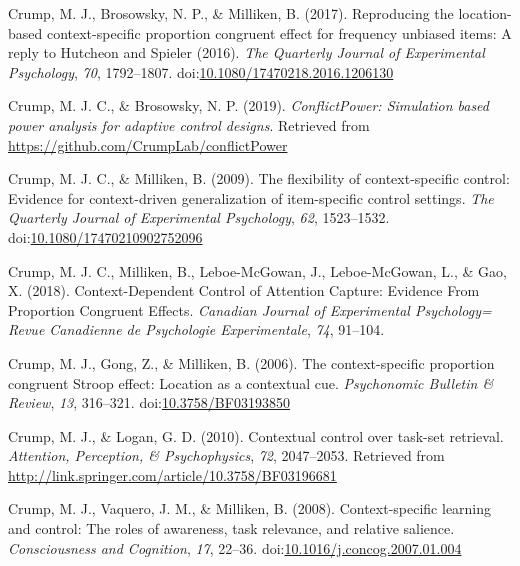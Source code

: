 \documentclass[english,,man,floatsintext]{apa6}
\begin{document}
\leavevmode\hypertarget{ref-crump_reproducing_2017}{}%
Crump, M. J., Brosowsky, N. P., \& Milliken, B. (2017). Reproducing the location-based context-specific proportion congruent effect for frequency unbiased items: A reply to Hutcheon and Spieler (2016). \emph{The Quarterly Journal of Experimental Psychology}, \emph{70}, 1792--1807. doi:\href{https://doi.org/10.1080/17470218.2016.1206130}{10.1080/17470218.2016.1206130}

\leavevmode\hypertarget{ref-r_conflictPower_2019}{}%
Crump, M. J. C., \& Brosowsky, N. P. (2019). \emph{ConflictPower: Simulation based power analysis for adaptive control designs}. Retrieved from \url{https://github.com/CrumpLab/conflictPower}

\leavevmode\hypertarget{ref-crump_flexibility_2009}{}%
Crump, M. J. C., \& Milliken, B. (2009). The flexibility of context-specific control: Evidence for context-driven generalization of item-specific control settings. \emph{The Quarterly Journal of Experimental Psychology}, \emph{62}, 1523--1532. doi:\href{https://doi.org/10.1080/17470210902752096}{10.1080/17470210902752096}

\leavevmode\hypertarget{ref-crump_context-dependent_2018}{}%
Crump, M. J. C., Milliken, B., Leboe-McGowan, J., Leboe-McGowan, L., \& Gao, X. (2018). Context-Dependent Control of Attention Capture: Evidence From Proportion Congruent Effects. \emph{Canadian Journal of Experimental Psychology= Revue Canadienne de Psychologie Experimentale}, \emph{74}, 91--104.

\leavevmode\hypertarget{ref-crump_context-specific_2006}{}%
Crump, M. J., Gong, Z., \& Milliken, B. (2006). The context-specific proportion congruent Stroop effect: Location as a contextual cue. \emph{Psychonomic Bulletin \& Review}, \emph{13}, 316--321. doi:\href{https://doi.org/10.3758/BF03193850}{10.3758/BF03193850}

\leavevmode\hypertarget{ref-crump_contextual_2010}{}%
Crump, M. J., \& Logan, G. D. (2010). Contextual control over task-set retrieval. \emph{Attention, Perception, \& Psychophysics}, \emph{72}, 2047--2053. Retrieved from \url{http://link.springer.com/article/10.3758/BF03196681}

\leavevmode\hypertarget{ref-crump_context-specific_2008}{}%
Crump, M. J., Vaquero, J. M., \& Milliken, B. (2008). Context-specific learning and control: The roles of awareness, task relevance, and relative salience. \emph{Consciousness and Cognition}, \emph{17}, 22--36. doi:\href{https://doi.org/10.1016/j.concog.2007.01.004}{10.1016/j.concog.2007.01.004}
\end{document}
